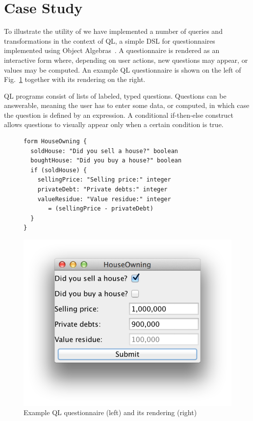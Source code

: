 \section{Case Study}

To illustrate the utility of \name we have implemented a number of queries and transformations in the context of QL, a simple DSL for questionnaires implemented using Object Algebras~\cite{gouseti14extensible}.
A questionnaire is rendered as an interactive form where, depending on user actions, new questions may appear, or values may be computed.
An example QL questionnaire is shown on the left of Fig.~\ref{FIG:houseowning} together with its rendering on the right.

QL programs consist of lists of labeled, typed questions.
Questions can be answerable, meaning the user has to enter some data, or computed, in which case the question is defined by an expression.
A conditional if-then-else construct allows questions to visually appear only when a certain condition is true.

\begin{figure}[t]
\hspace*{-5pt}\begin{minipage}{0.6\linewidth}
\begin{lstlisting}[language=ql]
form HouseOwning {
  soldHouse: "Did you sell a house?" boolean
  boughtHouse: "Did you buy a house?" boolean
  if (soldHouse) {
    sellingPrice: "Selling price:" integer
    privateDebt: "Private debts:" integer
    valueResidue: "Value residue:" integer
       = (sellingPrice - privateDebt)
  }
}
\end{lstlisting}
\end{minipage}
\begin{minipage}{0.5\linewidth}
  \includegraphics[width=\linewidth]{sections/screenshot}
\end{minipage}
\caption{Example QL questionnaire (left) and its rendering (right)}
\label{FIG:houseowning}
\end{figure}

